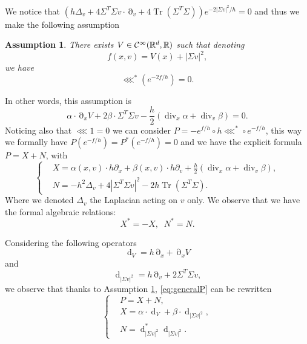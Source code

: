 \documentclass[12pt]{amsart}
\newcommand{\R}{\mathbb R}
\newcommand{\Tr}{{\operatorname{Tr}}}
\renewcommand{\div}{\operatorname{div}}
\renewcommand{\d}{\operatorname{d}}
\numberwithin{equation}{section}
\numberwithin{figure}{section}
\DeclareMathOperator{\p}{\partial}
\newtheorem{assumption}{Assumption}
\begin{document}
We notice that $(h\Delta_v + 4\Sigma^T\Sigma v\cdot\p_v + 4\Tr(\Sigma^T\Sigma))e^{-2|\Sigma v|^2/h} = 0$ and thus we make the following assumption
\begin{assumption}\label{ass.skewadj}
    There exists $V\in\ccc^\infty(\R^d,\R)$ such that denoting
    \begin{equation}\label{eq:f}
    f(x,v) = V(x) + |\Sigma v|^2,
    \end{equation}
    we have
    \begin{equation*}
    \lll^*(e^{-2f/h}) = 0.
    \end{equation*}
\end{assumption}
In other words, this assumption is
\begin{equation}\label{eq:assskew}
\alpha\cdot\p_xV + 2\beta\cdot\Sigma^T\Sigma v - \frac h2(\div_x\alpha+\div_v\beta) = 0.
\end{equation}
Noticing also that $\lll1=0$ we can consider $P = -e^{f/h}\circ h\lll^*\circ e^{-f/h}$, this way we formally have $P(e^{-f/h}) = P^*(e^{-f/h}) = 0$ and we have the explicit formula $P = X + N$, with
\begin{equation}\label{eq:generalP}
\left\{
\begin{aligned}
&X=\alpha(x,v)\cdot h\partial_x + \beta(x,v)\cdot h\partial_v + \frac h2(\div_x\alpha+\div_v\beta),\\
&N=-h^2\Delta_v + 4|\Sigma^T\Sigma v|^2 - 2h\Tr(\Sigma^T\Sigma).
\end{aligned}
\right.
\end{equation}
Where we denoted $\Delta_v$ the Laplacian acting on $v$ only. We observe that we have the formal algebraic relations:
\begin{equation}\label{eq:adj0}
X^* = -X,\;\;N^* = N.
\end{equation}

Considering the following operators
\begin{equation}\label{eq:dV}
\d_V = h\p_x + \p_x V
\end{equation}
and
\begin{equation}\label{eq:dSigmav}
\d_{|\Sigma v|^2} = h\p_v + 2\Sigma^T\Sigma v,
\end{equation}
we observe that thanks to Assumption \ref{ass.skewadj}, \eqref{eq:generalP} can be rewritten
\begin{equation}\label{eq:generalP2}
\left\{
\begin{aligned}
&P = X+N,\\
&X = \alpha\cdot \d_V + \beta\cdot\d_{|\Sigma v|^2},\\
&N = \d_{|\Sigma v|^2}^*\d_{|\Sigma v|^2}.
\end{aligned}
\right.
\end{equation}
\end{document}

